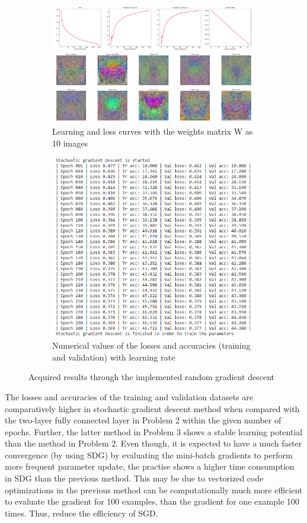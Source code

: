 \documentclass[11pt]{scrartcl}
\begin{document}
{\begin{figure}[H]
\centering
\begin{subfigure}{.5\textwidth}
  \centering
  \includegraphics[width=0.9\linewidth]{3_3.PNG}
  \caption{Learning and loss curves with the weights matrix W as 10 images}
  \label{fig:sub1}
\end{subfigure}%
\begin{subfigure}{0.5\textwidth}
  \centering
  \includegraphics[width=0.6\linewidth]{3_1.PNG}
  \caption{Numerical values of the losses and accuracies (training and validation) with learning rate}
  \label{fig:sub2}
\end{subfigure}
\caption{Acquired results through the implemented random gradient descent}
\label{fig:test}
\end{figure}

The losses and accuracies of the training and validation datasets are comparatively higher in stochastic gradient descent method when compared with the two-layer fully connected layer in Problem 2 within the given number of epochs. Further, the latter method in Problem 3 shows a stable learning potential than the method in Problem 2. Even though, it is expected to have a much faster convergence (by using SDG) by evaluating the mini-batch gradients to perform more frequent parameter update, the practise shows a higher time consumption in SDG than the previous method. This may be due to vectorized code optimizations in the previous method can be computationally much more efficient to evaluate the gradient for 100 examples, than the gradient for one example 100 times. Thus, reduce the efficiency of SGD. 

}
\end{document}
